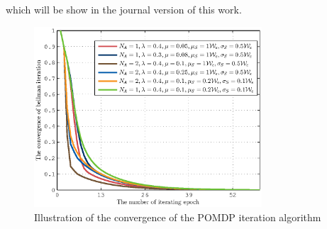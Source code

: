 \documentclass[conference]{IEEEtran}
\begin{document}
which will be show in the journal version of this work.
\begin{figure}
\centering
\includegraphics[width=8.5cm]{2_fig3.eps}
\caption{Illustration of the convergence of the POMDP iteration algorithm}
\end{figure}
\end{document}
